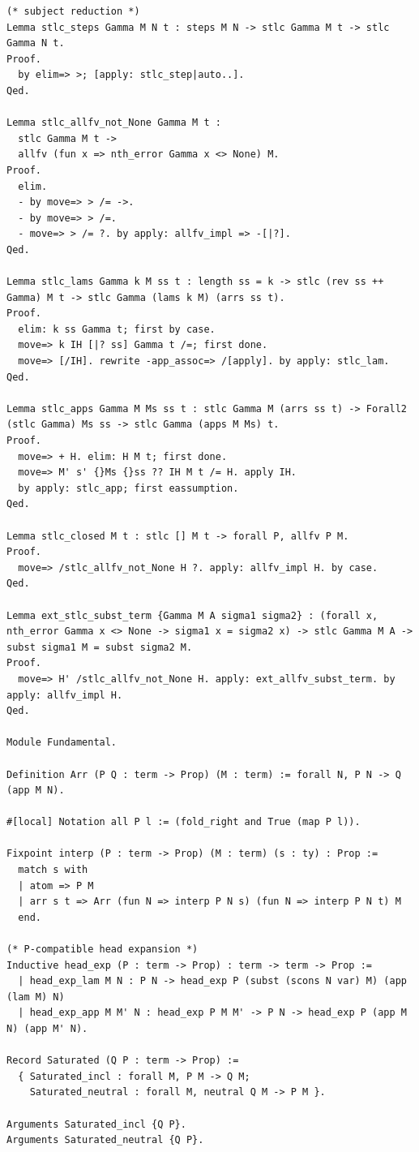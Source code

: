 \begin{lstlisting}
(* subject reduction *)
Lemma stlc_steps Gamma M N t : steps M N -> stlc Gamma M t -> stlc Gamma N t.
Proof.
  by elim=> >; [apply: stlc_step|auto..].
Qed.

Lemma stlc_allfv_not_None Gamma M t :
  stlc Gamma M t ->
  allfv (fun x => nth_error Gamma x <> None) M.
Proof.
  elim.
  - by move=> > /= ->.
  - by move=> > /=.
  - move=> > /= ?. by apply: allfv_impl => -[|?].
Qed.

Lemma stlc_lams Gamma k M ss t : length ss = k -> stlc (rev ss ++ Gamma) M t -> stlc Gamma (lams k M) (arrs ss t).
Proof.
  elim: k ss Gamma t; first by case.
  move=> k IH [|? ss] Gamma t /=; first done.
  move=> [/IH]. rewrite -app_assoc=> /[apply]. by apply: stlc_lam.
Qed.

Lemma stlc_apps Gamma M Ms ss t : stlc Gamma M (arrs ss t) -> Forall2 (stlc Gamma) Ms ss -> stlc Gamma (apps M Ms) t.
Proof.
  move=> + H. elim: H M t; first done.
  move=> M' s' {}Ms {}ss ?? IH M t /= H. apply IH.
  by apply: stlc_app; first eassumption.
Qed.

Lemma stlc_closed M t : stlc [] M t -> forall P, allfv P M.
Proof.
  move=> /stlc_allfv_not_None H ?. apply: allfv_impl H. by case.
Qed.

Lemma ext_stlc_subst_term {Gamma M A sigma1 sigma2} : (forall x, nth_error Gamma x <> None -> sigma1 x = sigma2 x) -> stlc Gamma M A -> subst sigma1 M = subst sigma2 M.
Proof.
  move=> H' /stlc_allfv_not_None H. apply: ext_allfv_subst_term. by apply: allfv_impl H.
Qed.

Module Fundamental.

Definition Arr (P Q : term -> Prop) (M : term) := forall N, P N -> Q (app M N).

#[local] Notation all P l := (fold_right and True (map P l)).

Fixpoint interp (P : term -> Prop) (M : term) (s : ty) : Prop :=
  match s with
  | atom => P M
  | arr s t => Arr (fun N => interp P N s) (fun N => interp P N t) M
  end.

(* P-compatible head expansion *)
Inductive head_exp (P : term -> Prop) : term -> term -> Prop :=
  | head_exp_lam M N : P N -> head_exp P (subst (scons N var) M) (app (lam M) N)
  | head_exp_app M M' N : head_exp P M M' -> P N -> head_exp P (app M N) (app M' N).

Record Saturated (Q P : term -> Prop) :=
  { Saturated_incl : forall M, P M -> Q M;
    Saturated_neutral : forall M, neutral Q M -> P M }.

Arguments Saturated_incl {Q P}.
Arguments Saturated_neutral {Q P}.


\end{lstlisting}
